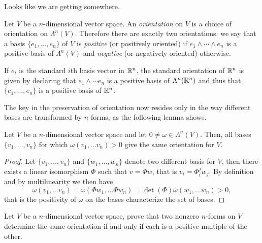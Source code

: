 Looks like we are getting somewhere.

\begin{definition}
  Let $V$ be a $n$-dimensional vector space.
  An \emph{orientation} on $V$ is a choice of orientation on $\Lambda^n(V)$.
  Therefore there are exactly two orientations: we say that a basis $\{e_1,\ldots,e_n\}$ of $V$ is \emph{positive} (or positively oriented) if $e_1\wedge\cdots\wedge e_n$ is a positive basis of $\Lambda^n(V)$ and \emph{negative} (or negatively oriented) otherwise.
\end{definition}

\begin{example}
  If $e_i$ is the standard $i$th basis vector in $\mathbb{R}^n$, the standard orientation of $\mathbb{R}^n$ is given by declaring that $e_1\wedge\cdots e_n$ is a positive basis of $\Lambda^n(\mathbb{R}^n)$ and thus that $\{e_1,\ldots,e_n\}$ is a positive basis of $\mathbb{R}^n$.
\end{example}

The key in the preservation of orientation now resides only in the way different bases are transformed by $n$-forms, as the following lemma shows.

\begin{lemma}\label{lemma:orient}
  Let $V$ be a $n$-dimensional vector space and let $0\neq \omega\in\Lambda^n(V)$.
  Then, all bases $\{v_1, \ldots, v_n\}$ for which $\omega(v_1,\ldots v_n) > 0$ give the same orientation for $V$.
\end{lemma}
\begin{proof}
  Let $\{v_1, \ldots, v_n\}$ and $\{w_1, \ldots, w_n\}$ denote two different basis for $V$, then there exists a linear isomorphism $\Phi$ such that $v = \Phi w$, that is $v_i = \Phi_{i}^j w_j$.
  By definition and by multilinearity we then have
  \begin{equation}\label{eq:posorie}
    \omega(v_1,\ldots v_n) = \omega(\Phi w_1,\ldots \Phi w_n) = \det(\Phi)\omega(w_1,\ldots w_n) > 0,
  \end{equation} that is the positivity of $\omega$ on the bases characterize the set of bases.
\end{proof}

\begin{exercise}
  Let $V$ be a $n$-dimensional vector space, prove that two nonzero $n$-forms on $V$ determine the same orientation if and only if each is a positive multiple of the other.
\end{exercise}

